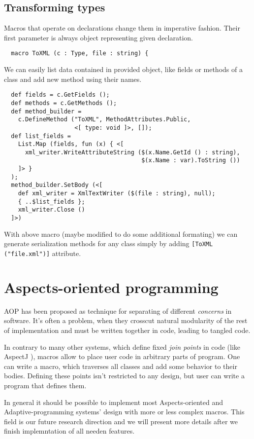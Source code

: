 \documentclass{llncs}
\begin{document}
\subsection{Transforming types}
Macros that operate on declarations change them in imperative fashion.
Their first parameter is always object representing given declaration. 

\begin{verbatim}
  macro ToXML (c : Type, file : string) { 
\end{verbatim}

We can easily list data contained in provided object, like fields or methods 
of a class and add new method using their names.

\begin{verbatim}
  def fields = c.GetFields ();
  def methods = c.GetMethods ();
  def method_builder = 
    c.DefineMethod ("ToXML", MethodAttributes.Public, 
                    <[ type: void ]>, []);
  def list_fields = 
    List.Map (fields, fun (x) { <[ 
      xml_writer.WriteAttributeString ($(x.Name.GetId () : string), 
                                       $(x.Name : var).ToString ()) 
    ]> }
  );
  method_builder.SetBody (<[
    def xml_writer = XmlTextWriter ($(file : string), null);
    { ..$list_fields };
    xml_writer.Close ()
  ]>)
\end{verbatim}

With above macro (maybe modified to do some additional formating) we can
generate serialization methods for any class simply by adding 
\verb,[ToXML ("file.xml")], attribute.

\section{Aspects-oriented programming}
AOP has been proposed as technique for separating of different 
\emph{concerns} in software. It's often a problem, when they crosscut 
natural modularity of the rest of implementation and must be written 
together in code, leading to tangled code. 

In contrary to many other systems, which define fixed \emph{join points}
in code (like AspectJ \cite{AspectJ}), macros allow to place user code in 
arbitrary parts of program. One can write a macro, which traverses all classes
and add some behavior to their bodies. Defining these points isn't
restricted to any design, but user can write a program that defines them.

In general it should be possible to implement most Aspects-oriented
and Adaptive-programming systems' design with more or less complex 
macros. This field is our future research direction and we will present
more details after we finish implemntation of all needen features.
\end{document}
